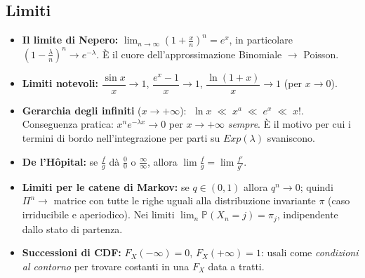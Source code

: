 \documentclass[12pt]{extarticle} %
\begin{document}
\subsection{Limiti}
\begin{itemize}
    \item \textbf{Il limite di Nepero:} $\displaystyle\lim_{n\to\infty}\left(1+\frac{x}{n}\right)^n = e^{x}$, \; in particolare $\left(1-\frac{\lambda}{n}\right)^n \to e^{-\lambda}$. {\footnotesize È il cuore dell'approssimazione Binomiale $\to$ Poisson.}
    \item \textbf{Limiti notevoli:} $\dfrac{\sin x}{x}\to 1$, \; $\dfrac{e^x-1}{x}\to 1$, \; $\dfrac{\ln(1+x)}{x}\to 1$ \; (per $x\to 0$).
    \item \textbf{Gerarchia degli infiniti} ($x\to+\infty$): $\;\ln x \;\ll\; x^{a} \;\ll\; e^{x} \;\ll\; x!$. \\ {\footnotesize Conseguenza pratica: $x^n e^{-\lambda x}\to 0$ per $x\to+\infty$ \emph{sempre}. È il motivo per cui i termini di bordo nell'integrazione per parti su $Exp(\lambda)$ svaniscono.}
    \item \textbf{De l'Hôpital:} se $\frac{f}{g}$ dà $\frac00$ o $\frac{\infty}{\infty}$, allora $\lim \frac{f}{g} = \lim \frac{f'}{g'}$.
    \item \textbf{Limiti per le catene di Markov:} se $q \in (0,1)$ allora $q^n \to 0$; quindi $\Pi^n \to$ matrice con tutte le righe uguali alla distribuzione invariante $\pi$ (caso irriducibile e aperiodico). {\footnotesize Nei limiti $\lim_n \mathbb{P}(X_n = j) = \pi_j$, indipendente dallo stato di partenza.}
    \item \textbf{Successioni di CDF:} $F_X(-\infty)=0$, $F_X(+\infty)=1$: usali come \emph{condizioni al contorno} per trovare costanti in una $F_X$ data a tratti.
\end{itemize}
\end{document}
